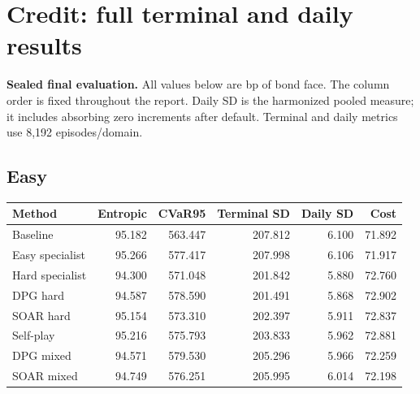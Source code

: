 \documentclass[11pt,a4paper]{article}
\begin{document}
\clearpage
\section{Credit: full terminal and daily results}
\textbf{Sealed final evaluation.} All values below are bp of bond face. The column order is fixed throughout the report. Daily SD is the harmonized pooled measure; it includes absorbing zero increments after default. Terminal and daily metrics use 8,192 episodes/domain.

\subsection*{Easy}
\begin{footnotesize}
\begin{tabular}{lrrrrr}
\toprule
Method & Entropic & CVaR95 & Terminal SD & Daily SD & Cost \\
\midrule
Baseline & 95.182 & 563.447 & 207.812 & 6.100 & 71.892 \\
Easy specialist & 95.266 & 577.417 & 207.998 & 6.106 & 71.917 \\
Hard specialist & 94.300 & 571.048 & 201.842 & 5.880 & 72.760 \\
DPG hard & 94.587 & 578.590 & 201.491 & 5.868 & 72.902 \\
SOAR hard & 95.154 & 573.310 & 202.397 & 5.911 & 72.837 \\
Self-play & 95.216 & 575.793 & 203.833 & 5.962 & 72.881 \\
DPG mixed & 94.571 & 579.530 & 205.296 & 5.966 & 72.259 \\
SOAR mixed & 94.749 & 576.251 & 205.995 & 6.014 & 72.198 \\
\bottomrule
\end{tabular}
\end{footnotesize}\par\medskip
\end{document}
